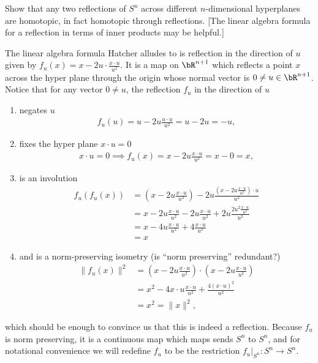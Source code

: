 \begin{homework}[e]
   Show that any two reflections of $S^n$ across different $n$-dimensional hyperplanes are homotopic, in fact homotopic through reflections. [The linear algebra formula for a reflection in terms of inner products may be helpful.]
  \begin{prf}
    The linear algebra formula Hatcher alludes to is reflection in the direction of $u$ given by $f_u(x) = x - 2u\cdot\frac{x\cdot u}{u^2}$. It is a map on $\bR^{n+1}$ which reflects a point $x$ across the hyper plane through the origin whose normal vector is $0 \neq u \in \bR^{n+1}$. Notice that for any vector $0 \neq u$, the reflection $f_u$ in the direction of $u$
    \begin{enumerate}[(1)]
      \item negates $u$
        \begin{align*}
          f_u(u) = u - 2u \frac{u\cdot u}{u^2} = u - 2u = -u,
        \end{align*}
      \item fixes the hyper plane $x\cdot u = 0$
        \begin{align*}
          x \cdot u = 0 \implies f_u(x) = x - 2u \frac{x \cdot u}{u^2} = x - 0 = x,
        \end{align*}
      \item is an involution
        \begin{align*}
          f_u\left(f_u(x)\right) &= \left(x - 2u \frac{x\cdot u}{u^2}\right) - 2u \frac{\left(x - 2u \frac{x\cdot u}{u^2}\right)\cdot u}{u^2} \\
            &= x - 2u \frac{x\cdot u}{u^2} - 2u \frac{x \cdot u}{u^2} + 2u\frac{2u^2\frac{x\cdot u}{u^2}}{u^2} \\
            &= x - 4u \frac{x\cdot u}{u^2} + 4 \frac{x\cdot u}{u^2}\\
            &= x
        \end{align*}
      \item and is a norm-preserving isometry (is ``norm preserving'' redundant?)
        \begin{align*}
          \|f_u(x)\|^2 &= \left(x - 2u \frac{x\cdot u}{u^2}\right)\cdot \left(x - 2u \frac{x\cdot u}{u^2}\right) \\
                       &= x^2 - 4x\cdot u \frac{x\cdot u}{u^2} + \frac{4(x\cdot u)^2}{u^2} \\
                       &= x^2 = \|x\|^2,
        \end{align*}
    \end{enumerate}
    which should be enough to convince us that this is indeed a reflection. Because $f_u$ is norm preserving, it is a continuous map which maps sends $S^n$ to $S^n$, and for notational convenience we will redefine $f_u$ to be the restriction $f_u|_{S^n}:S^n \to S^n$.


\end{prf}
\end{homework}
